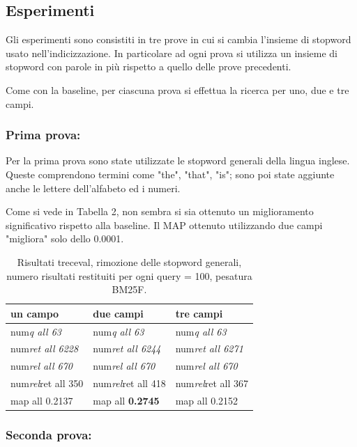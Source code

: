 \documentclass[runningheads]{llncs}
\begin{document}
\subsection{Esperimenti}

Gli esperimenti sono consistiti in tre prove in cui si cambia l'insieme di stopword usato nell'indicizzazione. In particolare ad ogni prova si utilizza un insieme di stopword con parole in pi\`u rispetto a quello delle prove precedenti.

Come con la baseline, per ciascuna prova si effettua la ricerca per uno, due e tre campi.

\subsubsection{Prima prova:}

Per la prima prova sono state utilizzate le stopword generali della lingua inglese. Queste comprendono termini come "the", "that", "is"; sono poi state aggiunte anche le lettere dell'alfabeto ed i numeri.

Come si vede in Tabella 2, non sembra si sia ottenuto un miglioramento significativo rispetto alla baseline. Il MAP ottenuto utilizzando due campi "migliora" solo dello 0.0001.
\begin{table}
\centering
\begin{tabular}{lll}
\hline
\textbf{ un campo }           & \textbf{ due campi }           & \textbf{ tre campi }            \\ \hline
 num\textit{q all 63 }       &  num\textit{q all 63 }       &  num\textit{q all 63 }        \\
 num\textit{ret all 6228 }  &  num\textit{ret all 6244 }  &  num\textit{ret all 6271 }   \\
 num\textit{rel all 670 }    &  num\textit{rel all 670 }    &  num\textit{rel all 670 }     \\
 num\textit{rel}ret all 350  &  num\textit{rel}ret all 418  &  num\textit{rel}ret all 367   \\
map all 0.2137               & map all \bf 0.2745               & map all 0.2152          \\ \hline
\end{tabular}

\caption{ Risultati treceval, rimozione delle stopword generali, numero risultati restituiti per ogni query = 100, pesatura BM25F.}
\end{table}

\subsubsection{Seconda prova:}
\end{document}
